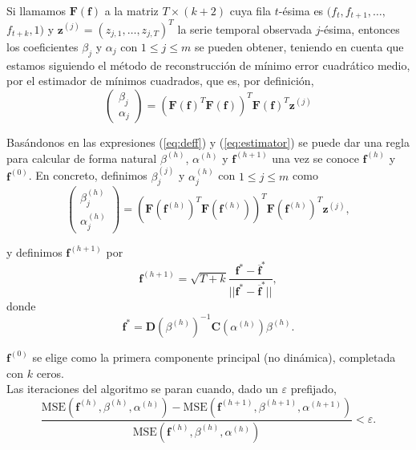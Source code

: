 Si llamamos $\mathbf{F}(\mathbf{f})$ a la matriz $T \times (k+2)$ cuya fila $t$-ésima es $(f_t, f_{t+1}, \dots,$ $ f_{t+k},1)$ y $\mathbf{z}^{(j)} = (z_{j,1}, \dots, z_{j,T})^T$ la serie temporal observada $j$-ésima, entonces los coeficientes $\beta_j$ y $\alpha_j$ con $1 \leq j \leq m$ se pueden obtener, teniendo en cuenta que estamos siguiendo el método de reconstrucción de mínimo error cuadrático medio, por el estimador de mínimos cuadrados, que es, por definición,
\begin{equation}\label{eq:estimator}
	\left( \begin{array}{c}
	\beta_j \\
	\alpha_j  \end{array} \right) = 
	(\mathbf{F}(\mathbf{f})^T \mathbf{F}(\mathbf{f}))^T \mathbf{F}(\mathbf{f})^T \mathbf{z}^{(j)}   
\end{equation}

Basándonos en las expresiones (\ref{eq:deff}) y (\ref{eq:estimator}) se puede dar una regla para calcular de forma natural $\beta^{(h)}$, $\alpha^{(h)}$ y $\mathbf{f}^{(h+1)}$ una vez se conoce $\mathbf{f}^{(h)}$ y $\mathbf{f}^{(0)}$. En concreto, definimos $\beta_j^{(j)}$ y $\alpha_j^{(h)}$ con $1 \leq j \leq m$ como
\[	\left( \begin{array}{c}
	\beta_j^{(h)} \\
	\alpha_j^{(h)}  \end{array} \right) = 
	(\mathbf{F}(\mathbf{f}^{(h)})^T \mathbf{F}(\mathbf{f}^{(h)}))^T \mathbf{F}(\mathbf{f}^{(h)})^T \mathbf{z}^{(j)},
\]

y definimos $\mathbf{f}^{(h+1)}$ por
\[	\mathbf{f}^{(h+1)} = \sqrt{T+k} \frac{\mathbf{f}^* - \overline{\mathbf{f}}^*}{||\mathbf{f}^* - \overline{\mathbf{f}}^*||},	\]
donde
\[	\mathbf{f}^* = \mathbf{D}(\beta^{(h)})^{-1} \mathbf{C}(\alpha^{(h)})\beta^{(h)}.	\]

$\mathbf{f}^{(0)}$ se elige como la primera componente principal (no dinámica), completada con $k$ ceros.\\

Las iteraciones del algoritmo se paran cuando, dado un $\varepsilon$ prefijado,
\[	\frac{\text{MSE}(\mathbf{f}^{(h)},\beta^{(h)},\alpha^{(h)}) - \text{MSE}(\mathbf{f}^{(h+1)},\beta^{(h+1)},\alpha^{(h+1)})}{\text{MSE}(\mathbf{f}^{(h)},\beta^{(h)},\alpha^{(h)})} < \varepsilon.	\]







%